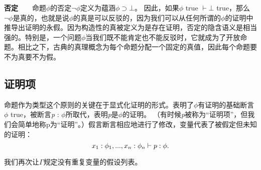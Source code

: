 \textbf{否定}${\qquad}$命题${\phi}$的否定${\lnot\phi}$定义为蕴涵${\phi\supset\bot}$。 因此，如果${\phi}$ true ${\vdash\bot}$ true，那么${\lnot\phi}$是真的，也就是说${\phi}$的真是可以反驳的，因为我们可以从任何所谓的${\phi}$的证明中推导出证明的永假。因为构造性的真被定义为是存在证明，否定的隐含语义是相当强的。特别是，一个问题${\phi}$当我们既不能肯定也不能反驳时，它就成为了开放命题。相比之下，古典的真理概念为每个命题分配一个固定的真值，因此每个命题要不为真要不为假。
\subsection{证明项}
命题作为类型这个原则的关键在于显式化证明的形式。表明了${\phi}$有证明的基础断言${\phi}$ true，被断言\textit{p} : ${\phi}$所取代，表明\textit{p}是${\phi}$的证明。 （有时候\textit{p}被称为“证明项”，但我们会简单地称p为“证明”。）假言断言相应地进行了修改，变量代表了被假定但未知的证明：
$$x_1 : \phi_1,...,x_n : \phi_n\vdash \mathnormal{p} : \phi.$$


我们再次让${\Gamma}$规定没有重复变量的假设列表。


